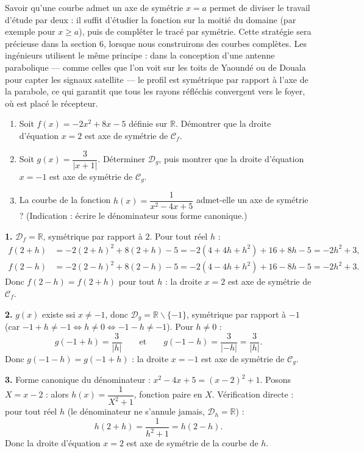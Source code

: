 \documentclass[11pt]{article}
\def\setminus{\mathbin{\backslash}}\let\smallsetminus\setminus
\begin{document}
\begin{savaistu}
Savoir qu'une courbe admet un axe de symétrie $x = a$ permet de diviser le travail d'étude par deux : il suffit d'étudier la fonction sur la moitié du domaine (par exemple pour $x \geq a$), puis de compléter le tracé par symétrie. Cette stratégie sera précieuse dans la section 6, lorsque nous construirons des courbes complètes. Les ingénieurs utilisent le même principe : dans la conception d'une antenne parabolique — comme celles que l'on voit sur les toits de Yaoundé ou de Douala pour capter les signaux satellite — le profil est symétrique par rapport à l'axe de la parabole, ce qui garantit que tous les rayons réfléchis convergent vers le foyer, où est placé le récepteur.
\end{savaistu}

\begin{exercice}
\begin{enumerate}
\item Soit $f(x) = -2x^2 + 8x - 5$ définie sur $\mathbb{R}$. Démontrer que la droite d'équation $x = 2$ est axe de symétrie de $\mathcal{C}_f$.
\item Soit $g(x) = \dfrac{3}{|x + 1|}$. Déterminer $\mathcal{D}_g$, puis montrer que la droite d'équation $x = -1$ est axe de symétrie de $\mathcal{C}_g$.
\item La courbe de la fonction $h(x) = \dfrac{1}{x^2 - 4x + 5}$ admet-elle un axe de symétrie ? (Indication : écrire le dénominateur sous forme canonique.)
\end{enumerate}
\end{exercice}

\begin{corrige}
\textbf{1.} $\mathcal{D}_f = \mathbb{R}$, symétrique par rapport à $2$. Pour tout réel $h$ :
\begin{align*}
f(2 + h) &= -2(2 + h)^2 + 8(2 + h) - 5 = -2(4 + 4h + h^2) + 16 + 8h - 5 = -2h^2 + 3,\\
f(2 - h) &= -2(2 - h)^2 + 8(2 - h) - 5 = -2(4 - 4h + h^2) + 16 - 8h - 5 = -2h^2 + 3.
\end{align*}
Donc $f(2 - h) = f(2 + h)$ pour tout $h$ : la droite $x = 2$ est axe de symétrie de $\mathcal{C}_f$.

\textbf{2.} $g(x)$ existe ssi $x \neq -1$, donc $\mathcal{D}_g = \mathbb{R} \setminus \{-1\}$, symétrique par rapport à $-1$ (car $-1 + h \neq -1 \iff h \neq 0 \iff -1 - h \neq -1$). Pour $h \neq 0$ :
\[ g(-1 + h) = \frac{3}{|h|} \qquad \text{et} \qquad g(-1 - h) = \frac{3}{|-h|} = \frac{3}{|h|}. \]
Donc $g(-1 - h) = g(-1 + h)$ : la droite $x = -1$ est axe de symétrie de $\mathcal{C}_g$.

\textbf{3.} Forme canonique du dénominateur : $x^2 - 4x + 5 = (x - 2)^2 + 1$. Posons $X = x - 2$ : alors $h(x) = \dfrac{1}{X^2 + 1}$, fonction paire en $X$. Vérification directe : pour tout réel $h$ (le dénominateur ne s'annule jamais, $\mathcal{D}_h = \mathbb{R}$) :
\[ h(2 + h) = \frac{1}{h^2 + 1} = h(2 - h). \]
Donc la droite d'équation $x = 2$ est axe de symétrie de la courbe de $h$.
\end{corrige}
\end{document}
